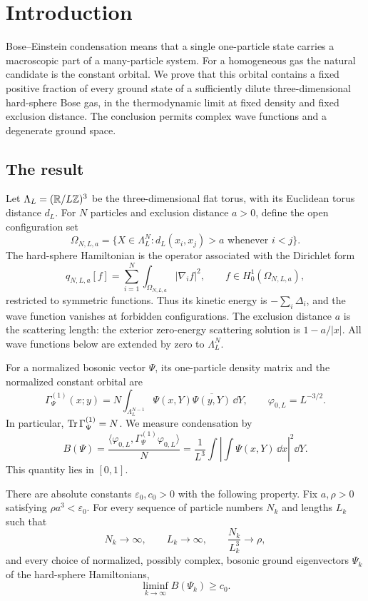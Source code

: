 \section{Introduction}\label{main:introduction}

Bose--Einstein condensation means that a single one-particle state carries
a macroscopic part of a many-particle system. For a homogeneous gas the
natural candidate is the constant orbital. We prove that this orbital
contains a fixed positive fraction of every ground state of a sufficiently
dilute three-dimensional hard-sphere Bose gas, in the thermodynamic limit
at fixed density and fixed exclusion distance. The conclusion permits
complex wave functions and a degenerate ground space.

\subsection{The result}

Let $\Lambda_L=(\mathbb R/L\mathbb Z)^3$ be the three-dimensional flat torus, with
its Euclidean torus distance $d_L$. For $N$ particles and exclusion
distance $a>0$, define the open configuration set
\[
 \Omega_{N,L,a}
  =\{X\in\Lambda_L^N:d_L(x_i,x_j)>a\text{ whenever }i<j\}.
\]
The hard-sphere Hamiltonian is the operator associated with the Dirichlet
form
\[
 q_{N,L,a}[f]=\sum_{i=1}^N\int_{\Omega_{N,L,a}}|\nabla_i f|^2,
 \qquad f\in H_0^1(\Omega_{N,L,a}),
\]
restricted to symmetric functions. Thus its kinetic energy is
$-\sum_i\Delta_i$, and the wave function vanishes at forbidden
configurations. The exclusion distance $a$ is the scattering length:
the exterior zero-energy scattering solution is $1-a/|x|$.
All wave functions below are extended by zero to $\Lambda_L^N$.

For a normalized bosonic vector $\Psi$, its one-particle density matrix
and the normalized constant orbital are
\[
 \Gamma^{(1)}_\Psi(x;y)
   =N\int_{\Lambda_L^{N-1}}
           \Psi(x,Y)\overline{\Psi(y,Y)}\,\dd Y,
 \qquad \varphi_{0,L}=L^{-3/2}.
\]
In particular, $\operatorname{Tr}\Gamma^{(1)}_\Psi=N$. We measure condensation by
\begin{equation}\label{main:occupation}
 B(\Psi)=\frac{\langle\varphi_{0,L},
                      \Gamma^{(1)}_\Psi\varphi_{0,L}\rangle}{N}
        =\frac1{L^3}\int\left|\int\Psi(x,Y)\,\dd x\right|^2\dd Y.
\end{equation}
This quantity lies in $[0,1]$.

\begin{theorem}\label{main:theorem}
There are absolute constants $\varepsilon_0,c_0>0$ with the following
property. Fix $a,\rho>0$ satisfying $\rho a^3<\varepsilon_0$.
For every sequence of particle numbers $N_k$ and lengths $L_k$ such that
\[
 N_k\longrightarrow\infty,\qquad L_k\longrightarrow\infty,
 \qquad \frac{N_k}{L_k^3}\longrightarrow\rho,
\]
and every choice of normalized, possibly complex, bosonic ground
eigenvectors $\Psi_k$ of the hard-sphere Hamiltonians,
\begin{equation}\label{main:limit}
 \liminf_{k\to\infty} B(\Psi_k)\ge c_0.
\end{equation}
\end{theorem}

